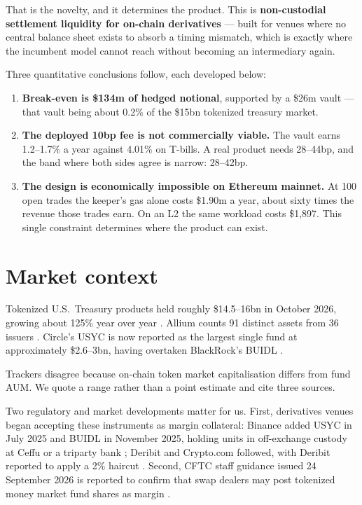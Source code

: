 \documentclass[11pt,a4paper]{article}
\newcommand{\note}[1]{{\small\color{muted}#1}}
\begin{document}
That is the novelty, and it determines the product. This is \textbf{non-custodial settlement liquidity
for on-chain derivatives} --- built for venues where no central balance sheet exists to absorb a
timing mismatch, which is exactly where the incumbent model cannot reach without becoming an
intermediary again.

Three quantitative conclusions follow, each developed below:

\begin{enumerate}
  \item \textbf{Break-even is \$134m of hedged notional}, supported by a \$26m vault — that vault
  being about 0.2\% of the \$15bn tokenized treasury market.
  \item \textbf{The deployed 10bp fee is not commercially viable.} The vault earns 1.2--1.7\% a year
  against 4.01\% on T-bills. A real product needs 28--44bp, and the band where both sides agree is
  narrow: 28--42bp.
  \item \textbf{The design is economically impossible on Ethereum mainnet.} At 100 open trades the
  keeper's gas alone costs \$1.90m a year, about sixty times the revenue those trades earn. On an L2 the same
  workload costs \$1,897. This single constraint determines where the product can exist.
\end{enumerate}

\section{Market context}

Tokenized U.S.\ Treasury products held roughly \$14.5--16bn in October 2026, growing about 125\% year
over year \cite{allium,cryptonomist,utoday}. Allium counts 91 distinct assets from 36 issuers
\cite{allium}. Circle's USYC is now reported as the largest single fund at approximately
\$2.6--3bn, having overtaken BlackRock's BUIDL \cite{coincentral}.

\note{Trackers disagree because on-chain token market capitalisation differs from fund AUM. We quote
a range rather than a point estimate and cite three sources.}

Two regulatory and market developments matter for us. First, derivatives venues began accepting these
instruments as margin collateral: Binance added USYC in July 2025 and BUIDL in November 2025, holding
units in off-exchange custody at Ceffu or a triparty bank \cite{binance,protofire}; Deribit and
Crypto.com followed, with Deribit reported to apply a 2\% haircut \cite{deribit,protofire}. Second,
CFTC staff guidance issued 24 September 2026 is reported to confirm that swap dealers may post
tokenized money market fund shares as margin \cite{protofire}.
\end{document}
